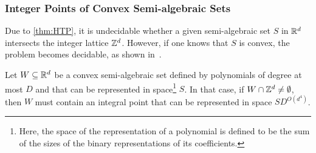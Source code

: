 \subsubsection{Integer Points of Convex Semi-algebraic Sets}

Due to \cref{thm:HTP}, it is undecidable whether a given semi-algebraic set $S$ in $\mathbb{R}^{d}$ intersects the integer lattice $\mathbb{Z}^{d}$. However, if one knows that $S$ is convex, the problem becomes decidable, as shown in~\cite{KhachiyanP97}.

\begin{theorem}
\label{thm:kp}
Let $W\subseteq\mathbb{R}^{d}$ be a convex semi-algebraic set defined by
  polynomials of degree at most $D$ and that can be represented in space\footnote{Here, the space of the representation of a polynomial is defined to be the sum of the sizes of the binary representations of its coefficients.}
$S$. In that case, if $W\cap\mathbb{Z}^{d}\neq\emptyset$, then $W$ must
contain an integral point that can be represented in space
$SD^{O(d^4)}$.
\end{theorem}
